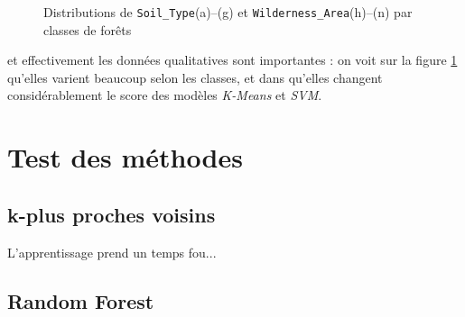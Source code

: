 \documentclass[12pt,a4paper]{article}
\numberwithin{equation}{section}
\newcommand{\wilderness}{\texttt{Wilderness\_Area}}
\newcommand{\soil}{\texttt{Soil\_Type}}
\begin{document}
\begin{figure}[h]
		\medskip
		
		\caption{Distributions de \soil (a)--(g) et \wilderness (h)--(n) par classes de forêts}
		\label{fig:soil-wild_hist}
	\end{figure}
	
	et effectivement les données qualitatives sont importantes : on voit sur la figure \ref{fig:soil-wild_hist} qu'elles varient beaucoup selon les classes, et dans \cite{C-D} qu'elles changent considérablement le score des modèles \textit{K-Means} et \textit{SVM}.
	
	\newpage
	
	\section{Test des méthodes}
	
	\subsection{k-plus proches voisins}
	
	L'apprentissage prend un temps fou...
	
	\subsection{Random Forest}
	
\end{document}
